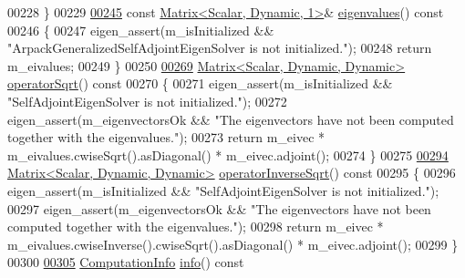 \begin{DoxyCode}
00228   \}
00229 
\hyperlink{class_eigen_1_1_arpack_generalized_self_adjoint_eigen_solver_ab46900dafdd11a8ac05a662c6b41480d}{00245}   \textcolor{keyword}{const} \hyperlink{group___core___module}{Matrix<Scalar, Dynamic, 1>}& \hyperlink{class_eigen_1_1_arpack_generalized_self_adjoint_eigen_solver_ab46900dafdd11a8ac05a662c6b41480d}{eigenvalues}()\textcolor{keyword}{ const}
00246 \textcolor{keyword}{  }\{
00247     eigen\_assert(m\_isInitialized && \textcolor{stringliteral}{"ArpackGeneralizedSelfAdjointEigenSolver is not initialized."});
00248     \textcolor{keywordflow}{return} m\_eivalues;
00249   \}
00250 
\hyperlink{class_eigen_1_1_arpack_generalized_self_adjoint_eigen_solver_a7522aad061ebccc065b254c0bc67d3b0}{00269}   \hyperlink{group___core___module}{Matrix<Scalar, Dynamic, Dynamic>} \hyperlink{class_eigen_1_1_arpack_generalized_self_adjoint_eigen_solver_a7522aad061ebccc065b254c0bc67d3b0}{operatorSqrt}()\textcolor{keyword}{ const}
00270 \textcolor{keyword}{  }\{
00271     eigen\_assert(m\_isInitialized && \textcolor{stringliteral}{"SelfAdjointEigenSolver is not initialized."});
00272     eigen\_assert(m\_eigenvectorsOk && \textcolor{stringliteral}{"The eigenvectors have not been computed together with the
       eigenvalues."});
00273     \textcolor{keywordflow}{return} m\_eivec * m\_eivalues.cwiseSqrt().asDiagonal() * m\_eivec.adjoint();
00274   \}
00275 
\hyperlink{class_eigen_1_1_arpack_generalized_self_adjoint_eigen_solver_ad55f052b675f1deaea220d0cc225622a}{00294}   \hyperlink{group___core___module}{Matrix<Scalar, Dynamic, Dynamic>} 
      \hyperlink{class_eigen_1_1_arpack_generalized_self_adjoint_eigen_solver_ad55f052b675f1deaea220d0cc225622a}{operatorInverseSqrt}()\textcolor{keyword}{ const}
00295 \textcolor{keyword}{  }\{
00296     eigen\_assert(m\_isInitialized && \textcolor{stringliteral}{"SelfAdjointEigenSolver is not initialized."});
00297     eigen\_assert(m\_eigenvectorsOk && \textcolor{stringliteral}{"The eigenvectors have not been computed together with the
       eigenvalues."});
00298     \textcolor{keywordflow}{return} m\_eivec * m\_eivalues.cwiseInverse().cwiseSqrt().asDiagonal() * m\_eivec.adjoint();
00299   \}
00300 
\hyperlink{class_eigen_1_1_arpack_generalized_self_adjoint_eigen_solver_a6f952eed50efe01b8cb91726e6a93b68}{00305}   \hyperlink{group__enums_ga85fad7b87587764e5cf6b513a9e0ee5e}{ComputationInfo} \hyperlink{class_eigen_1_1_arpack_generalized_self_adjoint_eigen_solver_a6f952eed50efe01b8cb91726e6a93b68}{info}()\textcolor{keyword}{ const}

\end{DoxyCode}
